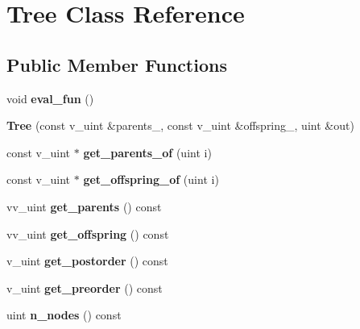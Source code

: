 \hypertarget{classTree}{}\section{Tree Class Reference}
\label{classTree}
\subsection*{Public Member Functions}
\begin{DoxyCompactItemize}
\item 
void {\bfseries eval\+\_\+fun} ()\hypertarget{classTree_a5a24565d179a3bd6edae1ff323060a93}{}\label{classTree_a5a24565d179a3bd6edae1ff323060a93}

\item 
{\bfseries Tree} (const v\+\_\+uint \&parents\+\_\+, const v\+\_\+uint \&offspring\+\_\+, uint \&out)\hypertarget{classTree_a0f964d9ba9834822d3e18946a5361839}{}\label{classTree_a0f964d9ba9834822d3e18946a5361839}

\item 
const v\+\_\+uint $\ast$ {\bfseries get\+\_\+parents\+\_\+of} (uint i)\hypertarget{classTree_adb9bede67bc875b58bb240d4c5421821}{}\label{classTree_adb9bede67bc875b58bb240d4c5421821}

\item 
const v\+\_\+uint $\ast$ {\bfseries get\+\_\+offspring\+\_\+of} (uint i)\hypertarget{classTree_a02c43c8a0bb0e7be7bf33436a8c05b30}{}\label{classTree_a02c43c8a0bb0e7be7bf33436a8c05b30}

\item 
vv\+\_\+uint {\bfseries get\+\_\+parents} () const \hypertarget{classTree_ae4f36e6d306946015965a7d9bc577a2a}{}\label{classTree_ae4f36e6d306946015965a7d9bc577a2a}

\item 
vv\+\_\+uint {\bfseries get\+\_\+offspring} () const \hypertarget{classTree_af8780369e1bc3a0d4e396bb91ad85a72}{}\label{classTree_af8780369e1bc3a0d4e396bb91ad85a72}

\item 
v\+\_\+uint {\bfseries get\+\_\+postorder} () const \hypertarget{classTree_a333503b86f195c8e84248a59eefe2fdf}{}\label{classTree_a333503b86f195c8e84248a59eefe2fdf}

\item 
v\+\_\+uint {\bfseries get\+\_\+preorder} () const \hypertarget{classTree_a22f81a8b7062b224f13dd1f2e7a1f7e0}{}\label{classTree_a22f81a8b7062b224f13dd1f2e7a1f7e0}

\item 
uint {\bfseries n\+\_\+nodes} () const \hypertarget{classTree_a69612e5a3a479c16d12b661e6bac4062}{}\label{classTree_a69612e5a3a479c16d12b661e6bac4062}


\end{DoxyCompactItemize}
